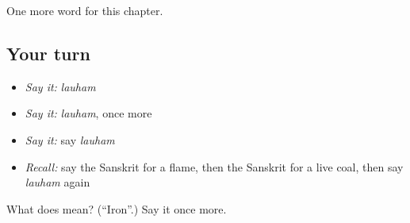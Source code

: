 \begin{grammarlens}[title={What you've built}]
One more word for this chapter.
\end{grammarlens}

\subsection*{Your turn}
\begin{itemize}
\raggedright
  \item \emph{Say it:} \emph{lauham}
  \item \emph{Say it:} \emph{lauham}, once more
  \item \emph{Say it:} say \emph{lauham}
  \item \emph{Recall:} say the Sanskrit for a flame, then the Sanskrit for a live coal, then say \emph{lauham} again
\end{itemize}

\begin{tcolorbox}[breakable,colback=teal!4,colframe=teal!35!black,title={Before you move on}]
What does  mean? (\textquotedblleft{}Iron\textquotedblright{}.) Say it once more.
\end{tcolorbox}
